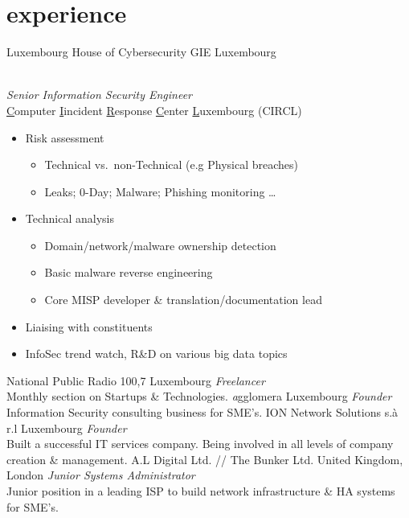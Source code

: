 \documentclass[]{friggeri-cv} %
\begin{document}
\section{experience}
\begin{entrylist}
{Luxembourg House of Cybersecurity GIE}
{Luxembourg}
{\\
\emph{Senior Information Security Engineer} \\
\underline{C}omputer \underline{I}incident \underline{R}esponse \underline{C}enter \underline{L}uxembourg (CIRCL)
\begin{itemize}
    \item Risk assessment
    \begin{itemize}
        \item Technical vs.\ non-Technical (e.g Physical breaches)
        \item Leaks; 0-Day; Malware; Phishing monitoring \ldots
    \end{itemize}
    \item Technical analysis
    \begin{itemize}
        \item Domain/network/malware ownership detection
        \item Basic malware reverse engineering
        \item Core MISP developer \& translation/documentation lead
    \end{itemize}
    \item Liaising with constituents
    \item InfoSec trend watch, R\&D on various big data topics
\end{itemize}
}
{National Public Radio 100,7}
{Luxembourg}
{\emph{Freelancer}\\
Monthly section on Startups \& Technologies.}
{\emph{a}gglomera}
{Luxembourg}
{\emph{Founder}\\
Information Security consulting business for SME's.}
{ION Network Solutions s.\`{a} r.l}
{Luxembourg}
{\emph{Founder} \\
Built a successful IT services company. Being involved in all levels of company creation \& management.}
{A.L Digital Ltd. // The Bunker Ltd.}
{United Kingdom, London}
{\emph{Junior Systems Administrator} \\
Junior position in a leading ISP to build network infrastructure \& HA systems for SME's.}
\end{entrylist}
\end{document}

